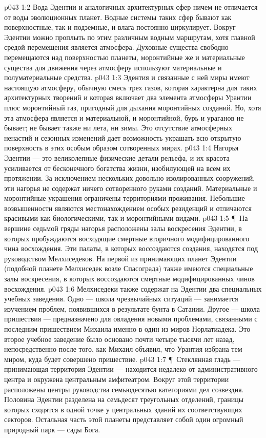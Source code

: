 \vs p043 1:2 Вода Эдентии и аналогичных архитектурных сфер ничем не отличается от воды эволюционных планет. Водные системы таких сфер бывают как поверхностные, так и подземные, и влага постоянно циркулирует. Вокруг Эдентии можно проплыть по этим различным водным маршрутам, хотя главной средой перемещения является атмосфера. Духовные существа свободно перемещаются над поверхностью планеты, моронтийные же и материальные существа для движения через атмосферу используют материальные и полуматериальные средства.
\vs p043 1:3 Эдентия и связанные с ней миры имеют настоящую атмосферу, обычную смесь трех газов, которая характерна для таких архитектурных творений и которая включает два элемента атмосферы Урантии плюс моронтийный газ, пригодный для дыхания моронтийных созданий. Но, хотя эта атмосфера является и материальной, и моронтийной, бурь и ураганов не бывает; не бывает также ни лета, ни зимы. Это отсутствие атмосферных ненастий и сезонных изменений дает возможность украшать всю открытую поверхность в этих особым образом сотворенных мирах.
\vs p043 1:4 Нагорья Эдентии --- это великолепные физические детали рельефа, и их красота усиливается от бесконечного богатства жизни, изобилующей на всем их протяжении. За исключением нескольких довольно изолированных сооружений, эти нагорья не содержат ничего сотворенного руками созданий. Материальные и моронтийные украшения ограничены территориями проживания. Небольшие возвышенности являются местонахождением особых резиденций и отличаются красивыми как биологическими, так и моронтийными видами.
\vs p043 1:5 \P\ На вершине седьмой гряды нагорья расположены залы воскресения Эдентии, в которых пробуждаются восходящие смертные вторичного модифицированного чина восхождения. Эти палаты, в которых воссоздаются создания, находятся под руководством Мелхиседеков. На первой из принимающих планет Эдентии (подобной планете Мелхиседек возле Спасограда) также имеются специальные залы воскресения, в которых воссоздаются смертные модифицированных чинов восхождения.
\vs p043 1:6 Мелхиседеки также содержат на Эдентии два специальных учебных заведения. Одно --- школа чрезвычайных ситуаций --- занимается изучением проблем, появившихся в результате бунта в Сатании. Другое --- школа пришествия --- предназначено для овладения новыми проблемами, связанными с последним пришествием Михаила именно в один из миров Норлатиадека. Это второе учебное заведение было основано почти четыре тысячи лет назад, непосредственно после того, как Михаил объявил, что Урантия избрана тем миром, куда будет совершено пришествие.
\vs p043 1:7 \P\ Стеклянная гладь --- принимающая территория Эдентии --- находится недалеко от административного центра и окружена центральным амфитеатром. Вокруг этой территории расположены центры руководства семьюдесятью категориями дел созвездия. Половина Эдентии разделена на семьдесят треугольных отделений, границы которых сходятся в одной точке у центральных зданий их соответствующих секторов. Остальная часть этой планеты представляет собой один огромный природный парк --- сады Бога.
